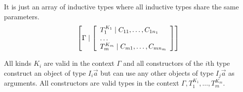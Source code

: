 It is just an array of inductive types where all inductive types share the same
parameters.
$$
    \left[\Gamma \mid
    \left[ \begin{array}{lllll} 
        T_1^{K_1} \mid C_{11}, \ldots, C_{1n_1}
        \\
        \ldots
        \\
        T_m^{K_m} \mid C_{m1}, \ldots, C_{mn_m}
     \end{array} \right]
    \right]
$$

All kinds $K_i$ are valid in the context $\Gamma$ and all constructors of the
$i$th type construct an object of type $I_i \vec a$ but can use any other
objects of type $I_j \vec a$ as arguments. All constructors are valid types in
the context $\Gamma, T_1^{K_1}, \ldots , T_m^{K_m}$.
